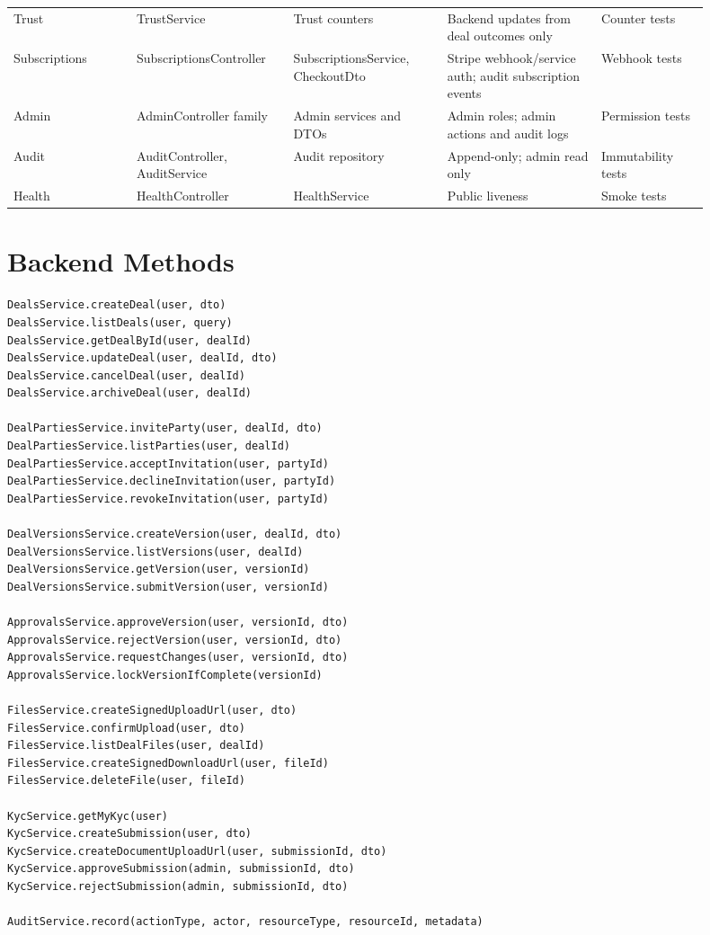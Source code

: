\begin{longtable}{p{0.16\linewidth}p{0.2\linewidth}p{0.2\linewidth}p{0.2\linewidth}p{0.14\linewidth}}
Trust & TrustService & Trust counters & Backend updates from deal outcomes only & Counter tests \\
Subscriptions & SubscriptionsController & SubscriptionsService, CheckoutDto & Stripe webhook/service auth; audit subscription events & Webhook tests \\
Admin & AdminController family & Admin services and DTOs & Admin roles; admin actions and audit logs & Permission tests \\
Audit & AuditController, AuditService & Audit repository & Append-only; admin read only & Immutability tests \\
Health & HealthController & HealthService & Public liveness & Smoke tests \\
\bottomrule
\end{longtable}

\section*{Backend Methods}
\begin{verbatim}
DealsService.createDeal(user, dto)
DealsService.listDeals(user, query)
DealsService.getDealById(user, dealId)
DealsService.updateDeal(user, dealId, dto)
DealsService.cancelDeal(user, dealId)
DealsService.archiveDeal(user, dealId)

DealPartiesService.inviteParty(user, dealId, dto)
DealPartiesService.listParties(user, dealId)
DealPartiesService.acceptInvitation(user, partyId)
DealPartiesService.declineInvitation(user, partyId)
DealPartiesService.revokeInvitation(user, partyId)

DealVersionsService.createVersion(user, dealId, dto)
DealVersionsService.listVersions(user, dealId)
DealVersionsService.getVersion(user, versionId)
DealVersionsService.submitVersion(user, versionId)

ApprovalsService.approveVersion(user, versionId, dto)
ApprovalsService.rejectVersion(user, versionId, dto)
ApprovalsService.requestChanges(user, versionId, dto)
ApprovalsService.lockVersionIfComplete(versionId)

FilesService.createSignedUploadUrl(user, dto)
FilesService.confirmUpload(user, dto)
FilesService.listDealFiles(user, dealId)
FilesService.createSignedDownloadUrl(user, fileId)
FilesService.deleteFile(user, fileId)

KycService.getMyKyc(user)
KycService.createSubmission(user, dto)
KycService.createDocumentUploadUrl(user, submissionId, dto)
KycService.approveSubmission(admin, submissionId, dto)
KycService.rejectSubmission(admin, submissionId, dto)

AuditService.record(actionType, actor, resourceType, resourceId, metadata)
\end{verbatim}

